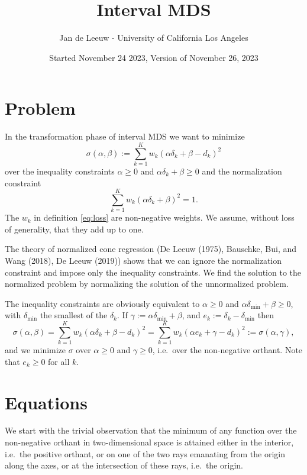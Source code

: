 \documentclass[
  12pt,
]{article}
\title{Interval MDS}
\author{Jan de Leeuw - University of California Los Angeles}
\date{Started November 24 2023, Version of November 26, 2023}
\begin{document}
\maketitle

{
\setcounter{tocdepth}{2}
\tableofcontents
}
\section{Problem}\label{problem}

In the transformation phase of interval MDS we want to minimize
\begin{equation}
\sigma(\alpha,\beta):=\sum_{k=1}^Kw_k(\alpha\delta_k+\beta-d_k)^2
\label{eq:loss}
\end{equation}
over the inequality constraints \(\alpha\geq 0\) and
\(\alpha\delta_k+\beta\geq 0\) and the normalization constraint
\begin{equation}
\sum_{k=1}^Kw_k(\alpha\delta_k+\beta)^2=1.
\end{equation}
The \(w_k\) in definition \eqref{eq:loss} are non-negative weights. We
assume, without loss of generality, that they add up to one.

The theory of normalized cone regression (De Leeuw (1975),
Bauschke, Bui, and Wang (2018), De Leeuw (2019)) shows that we can ignore the
normalization constraint and impose only the inequality constraints. We
find the solution to the normalized problem by normalizing the solution
of the unnormalized problem.

The inequality constraints are obviously equivalent to \(\alpha\geq 0\)
and \(\alpha\delta_{\text{min}}+\beta\geq 0\), with \(\delta_{\text{min}}\)
the smallest of the \(\delta_k\). If
\(\gamma:=\alpha\delta_{\text{min}}+\beta\), and
\(e_k:=\delta_k-\delta_{\text{min}}\) then \begin{equation}
\sigma(\alpha,\beta)=\sum_{k=1}^Kw_k(\alpha\delta_k+\beta-d_k)^2=\sum_{k=1}^Kw_k(\alpha e_k+\gamma-d_k)^2:=\sigma(\alpha,\gamma),
\end{equation} and we minimize \(\sigma\) over \(\alpha\geq 0\) and
\(\gamma\geq 0\), i.e.~over the non-negative orthant. Note that
\(e_k\geq 0\) for all \(k\).

\section{Equations}\label{equations}

We start with the trivial observation that the minimum of any function
over the non-negative orthant in two-dimensional space is attained
either in the interior, i.e.~the positive orthant, or on one of the two
rays emanating from the origin along the axes, or at the intersection of
these rays, i.e.~the origin.
\end{document}
